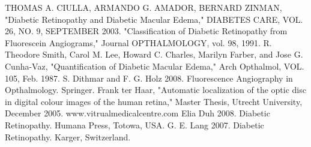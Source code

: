 \makeatletter
\renewcommand{\ps@plain}{%
\renewcommand\@oddhead{\hfil\normalfont\textrm{\thepage}}%
\renewcommand\@evenhead{}%
\renewcommand\@oddfoot{}%
\renewcommand\@evenfoot{}%
}
\makeatother
\pagestyle{myheadings}
\renewcommand\bibname{\uppercase{References}}
\begin{thebibliography}{300}
 THOMAS A. CIULLA, ARMANDO G. AMADOR, BERNARD ZINMAN, "Diabetic Retinopathy and Diabetic Macular Edema," DIABETES CARE, VOL. 26, NO. 9, SEPTEMBER 2003.
 "Classification of Diabetic Retinopathy from Fluorescein Angiograms," Journal OPTHALMOLOGY, vol. 98, 1991.
 R. Theodore Smith, Carol M. Lee, Howard C. Charles, Marilyn Farber, and Jose G. Cunha-Vaz, "Quantification of Diabetic Macular Edema," Arch Opthalmol, VOL. 105, Feb. 1987.
 S. Dithmar and F. G. Holz 2008. Fluorescence Angiography in Opthalmology. Springer.
 Frank ter Haar, "Automatic localization of the optic disc in digital colour images of the human retina," Master Thesis, Utrecht University, December 2005.
 www.vitrualmedicalcentre.com
 Elia Duh 2008. Diabetic Retinopathy. Humana Press, Totowa, USA.
 G. E. Lang 2007. Diabetic Retinopathy. Karger, Switzerland.



\end{thebibliography}
